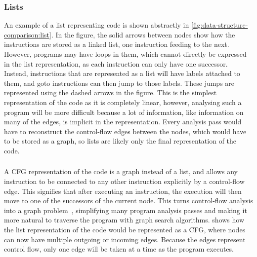 \subsubsection{Lists}

An example of a list representing code is shown abstractly in
\cref{fig:data-structure-comparison:list}.  In the figure, the solid arrows
between nodes show how the instructions are stored as a linked list, one
instruction feeding to the next.  However, programs may have loops in them,
which cannot directly be expressed in the list representation, as each
instruction can only have one successor.  Instead, instructions that are
represented as a list will have labels attached to them, and goto instructions
can then jump to those labels.  These jumps are represented using the dashed
arrows in the figure.  This is the simplest representation of the code as it is
completely linear, however, analysing such a program will be more difficult
because a lot of information, like information on many of the edges, is implicit
in the representation.  Every analysis pass would have to reconstruct the
control-flow edges between the nodes, which would have to be stored as a graph,
so lists are likely only the final representation of the code.

\subsubsection{}

A \gls{CFG} representation of the code is a graph instead of a list,
and allows any instruction to be connected to any other instruction explicitly
by a control-flow edge.  This signifies that after executing an instruction, the
execution will then move to one of the successors of the current node.  This
turns control-flow analysis into a graph problem~\cite[]{allen70_cfa},
simplifying many program analysis passes and making it more natural to traverse
the program with graph search algorithms.
 shows how the list representation of
the code would be represented as a \gls{CFG}, where nodes can now have multiple
outgoing or incoming edges.  Because the edges represent \gls{control flow},
only one edge will be taken at a time as the program executes.

\subsubsection{}

